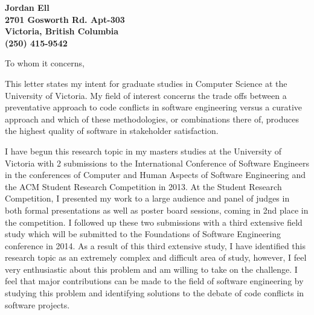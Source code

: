 \documentclass[11pt]{letter} %
\begin{document}

\begin{letter}{}


\begin{center}
\large\bf Jordan Ell \\ %
2701 Gosworth Rd. Apt-303 \\ Victoria, British Columbia\\ (250) 415-9542 %
\end{center}
\vfill

\signature{Jordan Ell} %


\opening{To whom it concerns,}

This letter states my intent for graduate studies in Computer Science at the University of Victoria. My field of interest concerns the trade offs between a preventative approach to code conflicts in software engineering versus a curative approach and which of these methodologies, or combinations there of, produces the highest quality of software in stakeholder satisfaction.

I have begun this research topic in my masters studies at the University of Victoria with 2 submissions to the International Conference of Software Engineers in the conferences of Computer and Human Aspects of Software Engineering and the ACM Student Research Competition in 2013. At the Student Research Competition, I presented my work to a large audience and panel of judges in both formal presentations as well as poster board sessions, coming in 2nd place in the competition. I followed up these two submissions with a third extensive field study which will be submitted to the Foundations of Software Engineering conference in 2014. As a result of this third extensive study, I have identified this research topic as an extremely complex and difficult area of study, however, I feel very enthusiastic about this problem and am willing to take on the challenge. I feel that major contributions can be made to the field of software engineering by studying this problem and identifying solutions to the debate of code conflicts in software projects.


\end{letter}
\end{document}
